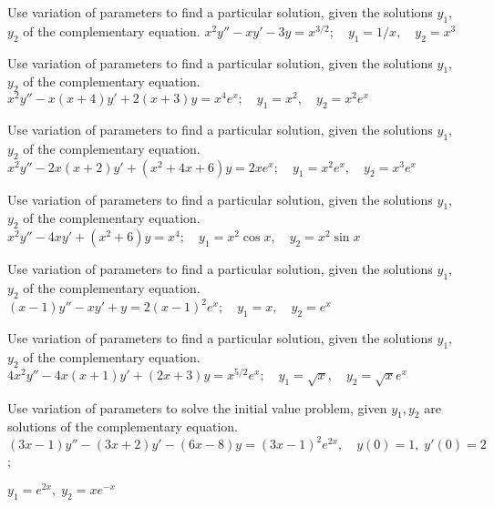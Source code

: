 \documentclass{ximera}
\begin{document}
\begin{problem}\label{exer:5.7.24}
Use variation
of parameters to find a particular solution, given the solutions
$y_1$, $y_2$ of the complementary equation. $x^2y''-xy'-3y=x^{3/2};  \quad y_1=1/x, \quad y_2=x^3$
\end{problem}

\begin{problem}\label{exer:5.7.25}
Use variation
of parameters to find a particular solution, given the solutions
$y_1$, $y_2$ of the complementary equation. $x^2y''-x(x+4)y'+2(x+3)y=x^4e^x;  \quad y_1=x^2, \quad y_2=x^2e^x$
\end{problem}

\begin{problem}\label{exer:5.7.26}
Use variation
of parameters to find a particular solution, given the solutions
$y_1$, $y_2$ of the complementary equation. $x^2y''-2x(x+2)y'+(x^2+4x+6)y=2xe^x;  \quad y_1=x^2e^x, \quad y_2=x^3e^x$
\end{problem}

\begin{problem}\label{exer:5.7.27}
Use variation
of parameters to find a particular solution, given the solutions
$y_1$, $y_2$ of the complementary equation. $x^2y''-4xy'+(x^2+6)y=x^4;  \quad y_1=x^2\cos x, \quad y_2=x^2\sin x$
\end{problem}

\begin{problem}\label{exer:5.7.28}
Use variation
of parameters to find a particular solution, given the solutions
$y_1$, $y_2$ of the complementary equation. $(x-1)y''-xy'+y=2(x-1)^2e^x;  \quad y_1=x, \quad y_2=e^x$
\end{problem}

\begin{problem}\label{exer:5.7.29}
Use variation
of parameters to find a particular solution, given the solutions
$y_1$, $y_2$ of the complementary equation. $4x^2y''-4x(x+1)y'+(2x+3)y=x^{5/2}e^x;   \quad
y_1=\sqrt x, \quad y_2=\sqrt xe^x$
\end{problem}


\begin{problem}\label{exer:5.7.30}
Use variation
of parameters to solve the initial value problem, given
$y_1,y_2$ are solutions of the complementary equation. $(3x-1)y''-(3x+2)y'-(6x-8)y=(3x-1)^2e^{2x}, \quad   y(0)=1,\;
y'(0)=2$;

$y_1=e^{2x},\;  y_2=xe^{-x}$
\end{problem}
\end{document}
